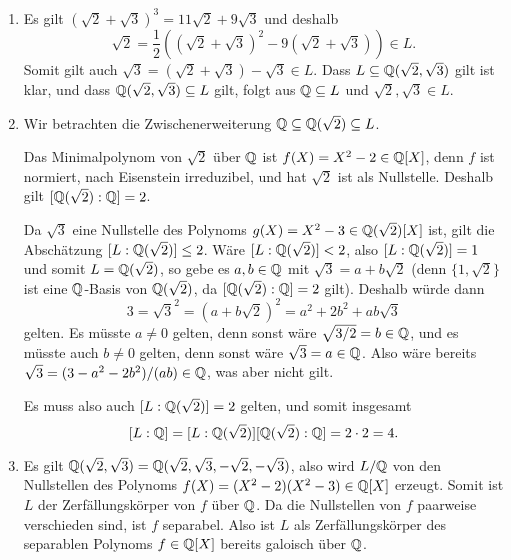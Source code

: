 \begin{solution}
  \begin{enumerate}
    \item
      Es gilt $(\sqrt{2} + \sqrt{3})^3 = 11 \sqrt{2} + 9 \sqrt{3}$ und deshalb
      \[
            \sqrt{2}
        =   \frac{1}{2}\left( (\sqrt{2} + \sqrt{3})^2 - 9(\sqrt{2} + \sqrt{3}) \right)
        \in L.
      \]
      Somit gilt auch $\sqrt{3} = (\sqrt{2} + \sqrt{3}) - \sqrt{3} \in L$.
      Dass $L \subseteq \mathbb{Q}(\sqrt{2}, \sqrt{3})$ gilt ist klar, und dass $\mathbb{Q}(\sqrt{2}, \sqrt{3}) \subseteq L$ gilt, folgt aus $\mathbb{Q} \subseteq L$ und $\sqrt{2}, \sqrt{3} \in L$.
      
    \item
      Wir betrachten die Zwischenerweiterung $\mathbb{Q} \subseteq \mathbb{Q}(\sqrt{2}) \subseteq L$.
      
      Das Minimalpolynom von $\sqrt{2}$ über $\mathbb{Q}$ ist $f(X) = X^2 - 2 \in \mathbb{Q}[X]$, denn $f$ ist normiert, nach Eisenstein irreduzibel, und hat $\sqrt{2}$ ist als Nullstelle.
      Deshalb gilt $[\mathbb{Q}(\sqrt{2}) : \mathbb{Q}] = 2$.
      
      Da $\sqrt{3}$ eine Nullstelle des Polynoms $g(X) = X^2 - 3 \in \mathbb{Q}(\sqrt{2})[X]$ ist, gilt die Abschätzung $[L : \mathbb{Q}(\sqrt{2})] \leq 2$.
      Wäre $[L : \mathbb{Q}(\sqrt{2})] < 2$, also $[L : \mathbb{Q}(\sqrt{2})] = 1$ und somit $L = \mathbb{Q}(\sqrt{2})$, so gebe es $a, b \in \mathbb{Q}$ mit $\sqrt{3} = a + b \sqrt{2}$ (denn $\{1, \sqrt{2}\}$ ist eine $\mathbb{Q}$-Basis von $\mathbb{Q}(\sqrt{2})$, da $[\mathbb{Q}(\sqrt{2}) : \mathbb{Q}] = 2$ gilt).
      Deshalb würde dann
      \[
          3
        = \sqrt{3}^2
        = (a + b \sqrt{2})^2
        = a^2 + 2 b^2 + ab \sqrt{3}
      \]
      gelten.
      Es müsste $a \neq 0$ gelten, denn sonst wäre $\sqrt{3/2} = b \in \mathbb{Q}$, und es müsste auch $b \neq 0$ gelten, denn sonst wäre $\sqrt{3} = a \in \mathbb{Q}$.
      Also wäre bereits $\sqrt{3} = (3 - a^2 - 2b^2)/(ab) \in \mathbb{Q}$, was aber nicht gilt.
      
      Es muss also auch $[L : \mathbb{Q}(\sqrt{2})] = 2$ gelten, und somit insgesamt
      \[
          [L : \mathbb{Q}]
        = [L : \mathbb{Q}(\sqrt{2})] [\mathbb{Q}(\sqrt{2}) : \mathbb{Q}]
        = 2 \cdot 2
        = 4.
      \]
      
    \item
      Es gilt $\mathbb{Q}(\sqrt{2}, \sqrt{3}) = \mathbb{Q}(\sqrt{2}, \sqrt{3}, -\sqrt{2}, -\sqrt{3})$, also wird $L/\mathbb{Q}$ von den Nullstellen des Polynoms $f(X) = (X^2 - 2)(X^2 - 3) \in \mathbb{Q}[X]$ erzeugt.
      Somit ist $L$ der Zerfällungskörper von $f$ über $\mathbb{Q}$.
      Da die Nullstellen von $f$ paarweise verschieden sind, ist $f$ separabel.
      Also ist $L$ als Zerfällungskörper des separablen Polynoms $f \in \mathbb{Q}[X]$ bereits galoisch über $\mathbb{Q}$.
    

\end{enumerate}
\end{solution}
